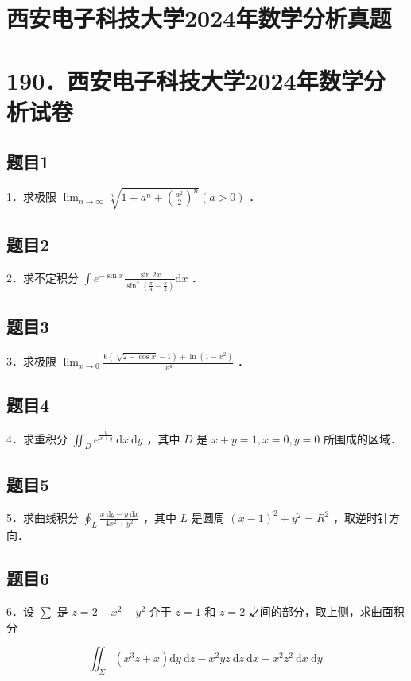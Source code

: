 \documentclass{article}
\begin{document}
\section*{西安电子科技大学2024年数学分析真题}
\section*{190．西安电子科技大学2024年数学分析试卷}

\subsection{题目1}
1．求极限 \(\lim _{n \rightarrow \infty} \sqrt[n]{1+a^{n}+\left(\frac{a^{2}}{2}\right)^{n}}(a>0)\) ．

\subsection{题目2}
2．求不定积分 \(\int e^{-\sin x} \frac{\sin 2 x}{\sin ^{4}\left(\frac{\pi}{4}-\frac{x}{2}\right)} \mathrm{d} x\) ．

\subsection{题目3}
3．求极限 \(\lim _{x \rightarrow 0} \frac{6(\sqrt[3]{2-\cos x}-1)+\ln \left(1-x^{2}\right)}{x^{4}}\) ．

\subsection{题目4}
4．求重积分 \(\iint_{D} e^{\frac{y}{x+y}} \mathrm{~d} x \mathrm{~d} y\) ，其中 \(D\) 是 \(x+y=1, x=0, y=0\) 所围成的区域．

\subsection{题目5}
5．求曲线积分 \(\oint_{L} \frac{x \mathrm{~d} y-y \mathrm{~d} x}{4 x^{2}+y^{2}}\) ，其中 \(L\) 是圆周 \((x-1)^{2}+y^{2}=R^{2}\) ，取逆时针方向．

\subsection{题目6}
6．设 \(\sum\) 是 \(z=2-x^{2}-y^{2}\) 介于 \(z=1\) 和 \(z=2\) 之间的部分，取上侧，求曲面积分

\[
\iint_{\Sigma}\left(x^{3} z+x\right) \mathrm{d} y \mathrm{~d} z-x^{2} y z \mathrm{~d} z \mathrm{~d} x-x^{2} z^{2} \mathrm{~d} x \mathrm{~d} y .
\]
\end{document}
